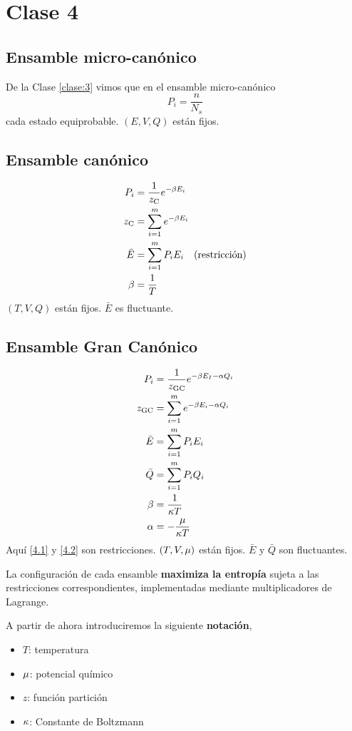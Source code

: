 \section{Clase 4}
\subsection{Ensamble micro-canónico}
De la Clase \ref{clase:3} vimos que en el ensamble micro-canónico
\begin{equation}
  P_i=\frac{n}{N_s}
\end{equation}
cada estado equiprobable. $(E,V,Q)$ están fijos.

\subsection{Ensamble canónico}
\begin{align}
  P_i&=\frac{1}{z_{\rm C}}e^{-\beta E_i}\\ z_{\rm C}&=\sum_{i=1}^m e^{-\beta E_i}\\ \bar{E}&=\sum_{i=1}^m P_iE_i \quad \text{(restricción)}\\
  \beta&=\frac{1}{T}
\end{align}
$(T,V,Q)$ están fijos. $\bar{E}$ es fluctuante.

\subsection{Ensamble Gran Canónico}
\begin{align}
  P_i&=\frac{1}{z_{\rm GC}}e^{-\beta E_I-\alpha Q_i}\\
  z_{\rm GC}&=\sum_{i=1}^m e^{-\beta E_i-\alpha Q_i}\\
  \bar{E}&=\sum_{i=1}^m P_iE_i\label{4.1}\\
  \bar{Q}&=\sum_{i=1}^m P_iQ_i\label{4.2}\\
  \beta&=\frac{1}{\kappa T}\\
  \alpha&=-\frac{\mu}{\kappa T}
\end{align}
Aquí \eqref{4.1} y \eqref{4.2} son restricciones. $(T,V,\mu)$ están fijos. $\bar{E}$ y $\bar{Q}$ son fluctuantes.

La configuración de cada ensamble \textbf{maximiza la entropía} sujeta a las restricciones correspondientes, implementadas mediante multiplicadores de Lagrange.

\begin{tcolorbox}
	A partir de ahora introduciremos la siguiente \textbf{notación}, 
	\begin{itemize}
		\item $T$: temperatura
		\item $\mu$: potencial químico
		\item $z$: función partición
		\item $\kappa$: Constante de Boltzmann
	\end{itemize}	
\end{tcolorbox}


